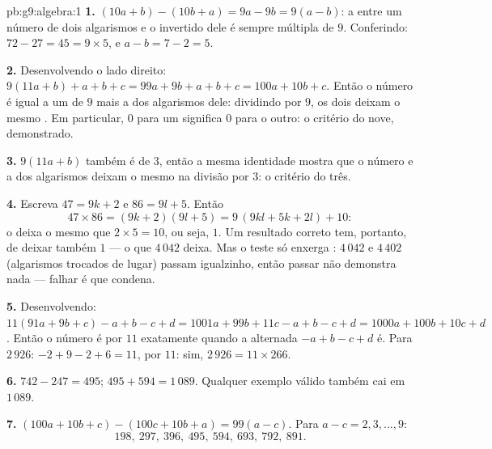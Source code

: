 \begin{solution}{pb:g9:algebra:1}
\textbf{1.} $(10a + b) - (10b + a) = 9a - 9b = 9(a - b)$: a 
entre um número de dois algarismos e o invertido dele é sempre múltipla
de $9$. Conferindo: $72 - 27 = 45 = 9 \times 5$, e
$a - b = 7 - 2 = 5$.

\textbf{2.} Desenvolvendo o lado direito:
$9(11a + b) + a + b + c = 99a + 9b + a + b + c = 100a + 10b + c$.
Então o número é igual a um  de $9$ mais a  dos algarismos
dele: dividindo por $9$, os dois deixam o mesmo . Em particular,
 $0$ para um significa  $0$ para o outro: o critério do nove,
demonstrado.

\textbf{3.} $9(11a + b)$ também é  de $3$, então a mesma
identidade mostra que o número e a  dos algarismos deixam o mesmo
 na divisão por $3$: o critério do três.

\textbf{4.} Escreva $47 = 9k + 2$ e $86 = 9l + 5$. Então
\[
47 \times 86 = (9k + 2)(9l + 5)
= 9\,(9kl + 5k + 2l) + 10 :
\]
o  deixa o mesmo  que $2 \times 5 = 10$, ou seja, $1$. Um
resultado correto tem, portanto, de deixar também  $1$ --- o que
$4\,042$ deixa. Mas o teste só enxerga : $4\,042$ e $4\,402$
(algarismos trocados de lugar) passam igualzinho, então passar não
demonstra nada --- falhar é que condena.

\textbf{5.} Desenvolvendo:
$11(91a + 9b + c) - a + b - c + d = 1001a + 99b + 11c - a + b - c + d
= 1000a + 100b + 10c + d$. Então o número é  por $11$
exatamente quando a  alternada $-a + b - c + d$ é. Para $2\,926$:
$-2 + 9 - 2 + 6 = 11$,  por $11$: sim,
$2\,926 = 11 \times 266$.

\textbf{6.} $742 - 247 = 495$; $495 + 594 = 1\,089$. Qualquer exemplo
válido também cai em $1\,089$.

\textbf{7.} $(100a + 10b + c) - (100c + 10b + a) = 99(a - c)$. Para
$a - c = 2, 3, \dots, 9$:
\[
198,\ 297,\ 396,\ 495,\ 594,\ 693,\ 792,\ 891 .
\]


\end{solution}
